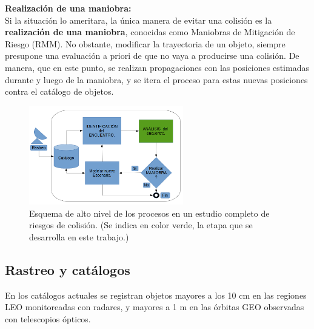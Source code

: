 {\bf{Realizaci\'on de una maniobra:}}\\
Si la situaci\'on lo ameritara, la \'unica manera de evitar una colisi\'on es la {\bf{realizaci\'on de una maniobra}}, conocidas como Maniobras de Mitigaci\'on de Riesgo (RMM). No obstante, modificar la trayectoria de un objeto, siempre presupone una evaluaci\'on a priori de que no vaya a producirse una colisi\'on. De manera, que en este punto, se realizan propagaciones con las posiciones estimadas durante y luego de la maniobra, y se itera el proceso para estas nuevas posiciones contra el cat\'alogo de objetos.\\ 



\begin{figure}[!h]
  \centering
  \includegraphics[width=0.6\textwidth]{imagenes/estudiocolision}
  \caption[Estudio de Colisi\'on]{Esquema de alto nivel de los procesos en un estudio completo de riesgos de colisi\'on. (Se indica en color verde, la etapa que se desarrolla en este trabajo.)}
  \label{fig:estudiocolision}
\end{figure}



\subsection{Rastreo y cat\'alogos}\label{subsec:redes}

En los catálogos actuales se registran objetos mayores a los 10 cm en las regiones LEO monitoreadas con radares, y mayores a 1 m en las órbitas GEO observadas con telescopios ópticos.\\
 
